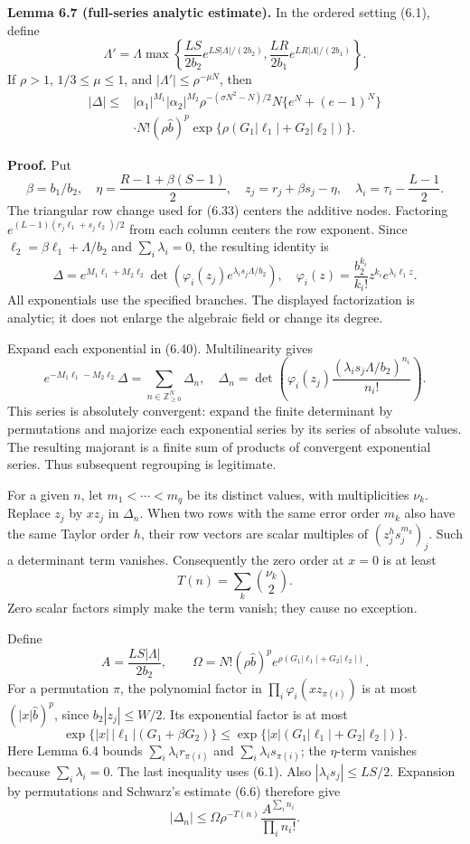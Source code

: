 \documentclass[
  11pt,
  a4paper,
]{article}
\begin{document}
\textbf{Lemma 6.7 (full-series analytic estimate).} In the ordered
setting (6.1), define \[
\Lambda'=\Lambda\max\left\{
\frac{LS}{2b_2}e^{LS|\Lambda|/(2b_2)},
\frac{LR}{2b_1}e^{LR|\Lambda|/(2b_1)}\right\}.
\tag{6.38}
\] If \(\rho>1\), \(1/3\le\mu\le1\), and \(|\Lambda'|\le\rho^{-\mu N}\),
then \[
\begin{aligned}
|\Delta|\le{}&|\alpha_1|^{M_1}|\alpha_2|^{M_2}
\rho^{-(\sigma N^2-N)/2}N\{e^N+(e-1)^N\}\\
&\cdot N!(\rho\widehat b)^p
\exp\{\rho(G_1|\ell_1|+G_2|\ell_2|)\}.
\end{aligned}
\tag{6.39}
\]

\textbf{Proof.} Put \[
\beta=b_1/b_2,\quad \eta=\frac{R-1+\beta(S-1)}2,\quad
z_j=r_j+\beta s_j-\eta,\quad
\lambda_i=\tau_i-\frac{L-1}{2}.
\] The triangular row change used for (6.33) centers the additive nodes.
Factoring \(e^{(L-1)(r_j\ell_1+s_j\ell_2)/2}\) from each column centers
the row exponent. Since \(\ell_2=\beta\ell_1+\Lambda/b_2\) and
\(\sum_i\lambda_i=0\), the resulting identity is \[
\Delta=e^{M_1\ell_1+M_2\ell_2}
\det\left(\varphi_i(z_j)e^{\lambda_i s_j\Lambda/b_2}\right),
\quad
\varphi_i(z)=\frac{b_2^{k_i}}{k_i!}z^{k_i}e^{\lambda_i\ell_1z}.
\tag{6.40}
\] All exponentials use the specified branches. The displayed
factorization is analytic; it does not enlarge the algebraic field or
change its degree.

Expand each exponential in (6.40). Multilinearity gives \[
e^{-M_1\ell_1-M_2\ell_2}\Delta
=\sum_{n\in\mathbb Z_{\ge0}^{N}}\Delta_n,
\quad
\Delta_n=\det\left(\varphi_i(z_j)
              \frac{(\lambda_i s_j\Lambda/b_2)^{n_i}}{n_i!}\right).
\tag{6.41}
\] This series is absolutely convergent: expand the finite determinant
by permutations and majorize each exponential series by its series of
absolute values. The resulting majorant is a finite sum of products of
convergent exponential series. Thus subsequent regrouping is legitimate.

For a given \(n\), let \(m_1<\cdots<m_q\) be its distinct values, with
multiplicities \(\nu_k\). Replace \(z_j\) by \(xz_j\) in \(\Delta_n\).
When two rows with the same error order \(m_k\) also have the same
Taylor order \(h\), their row vectors are scalar multiples of
\((z_j^h s_j^{m_k})_j\). Such a determinant term vanishes. Consequently
the zero order at \(x=0\) is at least \[
T(n)=\sum_k\binom{\nu_k}{2}.
\tag{6.42}
\] Zero scalar factors simply make the term vanish; they cause no
exception.

Define \[
A=\frac{LS|\Lambda|}{2b_2},\qquad
\Omega=N!(\rho\widehat b)^p
e^{\rho(G_1|\ell_1|+G_2|\ell_2|)}.
\] For a permutation \(\pi\), the polynomial factor in
\(\prod_i\varphi_i(xz_{\pi(i)})\) is at most \((|x|\widehat b)^p\),
since \(b_2|z_j|\le W/2\). Its exponential factor is at most \[
\exp\{|x|\,|\ell_1|(G_1+\beta G_2)\}
\le \exp\{|x|(G_1|\ell_1|+G_2|\ell_2|)\}.
\] Here Lemma 6.4 bounds \(\sum_i\lambda_i r_{\pi(i)}\) and
\(\sum_i\lambda_i s_{\pi(i)}\); the \(\eta\)-term vanishes because
\(\sum_i\lambda_i=0\). The last inequality uses (6.1). Also
\(|\lambda_i s_j|\le LS/2\). Expansion by permutations and Schwarz's
estimate (6.6) therefore give \[
|\Delta_n|\le\Omega\rho^{-T(n)}
\frac{A^{\sum_i n_i}}{\prod_i n_i!}.
\tag{6.43}
\]
\end{document}
